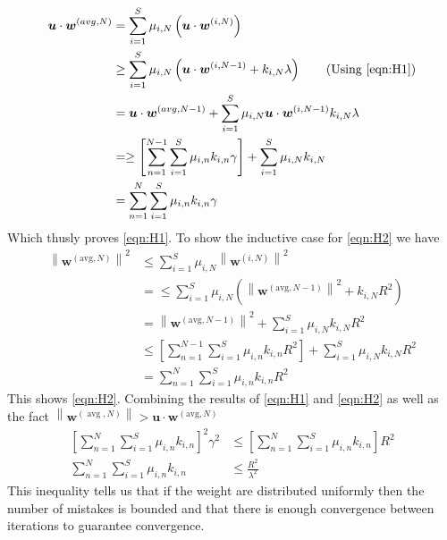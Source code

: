 \begin{align*}
    \bm{u} \cdot \bm{w}^{(avg,N)} &= \sum_{i=1}^{S} \mu_{i,N} \left( \bm{u} \cdot \bm{w}^{(i,N)} \right) \\
    &\geq \sum_{i=1}^{S} \mu_{i,N} \left( \bm{u} \cdot \bm{w}^{(i,N-1)} + k_{i,N} \lambda \right) \tag{Using \ref{eqn:H1}} \\
    &= \bm{u} \cdot \bm{w}^{(avg,N-1)} + \sum_{i=1}^{S} \mu_{i,N} \bm{u} \cdot \bm{w}^{(i,N-1)} k_{i,N} \lambda \\
    &= \geq\left[\sum_{n=1}^{N-1} \sum_{i=1}^{S} \mu_{i, n} k_{i, n} \gamma\right]+\sum_{i=1}^{S} \mu_{i, N} k_{i, N} \\
    &= \sum_{n=1}^{N} \sum_{i=1}^{S} \mu_{i, n} k_{i, n} \gamma
\end{align*}
Which thusly proves \ref{eqn:H1}. To show the inductive case for \ref{eqn:H2} we have
\begin{align*}
    \left\|\mathbf{w}^{(\mathrm{avg}, N)}\right\|^{2} &\leq \sum_{i=1}^{S} \mu_{i, N}\left\|\mathbf{w}^{(i, N)}\right\|^{2} \\
    &= \leq \sum_{i=1}^{S} \mu_{i, N}\left(\left\|\mathbf{w}^{(\mathrm{avg}, N-1)}\right\|^{2}+k_{i, N} R^{2}\right) \\
    &= \left\|\mathbf{w}^{(\mathrm{avg}, N-1)}\right\|^{2}+\sum_{i=1}^{S} \mu_{i, N} k_{i, N} R^{2} \\
    &\leq \left[\sum_{n=1}^{N-1} \sum_{i=1}^{S} \mu_{i, n} k_{i, n} R^{2}\right]+\sum_{i=1}^{S} \mu_{i, N} k_{i, N} R^{2} \\
    &= \sum_{n=1}^{N} \sum_{i=1}^{S} \mu_{i, n} k_{i, n} R^{2}
\end{align*}
This shows \ref{eqn:H2}. Combining the results of \ref{eqn:H1} and \ref{eqn:H2} as well as the fact $\left\|\mathbf{w}^{(\operatorname{avg}, N)}\right\|>\mathbf{u} \cdot \mathbf{w}^{(\mathrm{avg}, N)}$
\begin{align*}
    \left[\sum_{n=1}^{N} \sum_{i=1}^{S} \mu_{i, n} k_{i, n}\right]^{2} \gamma^{2} &\leq \left[\sum_{n=1}^{N} \sum_{i=1}^{S} \mu_{i, n} k_{i, n}\right] R^{2} \\
    \sum_{n=1}^{N} \sum_{i=1}^{S} \mu_{i, n} k_{i, n} &\leq \frac{R^2}{\lambda^2}
\end{align*}
This inequality tells us that if the weight are distributed uniformly then the number of mistakes is bounded and that there is enough convergence between iterations to guarantee convergence.